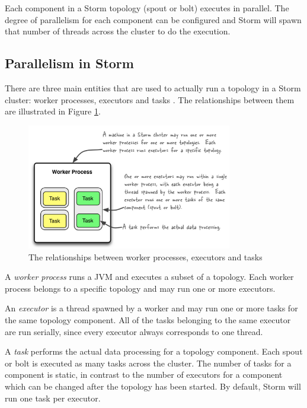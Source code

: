 Each component in a Storm topology (spout or bolt) executes in parallel. The degree of parallelism for each component can be configured and Storm will spawn that number of threads across the cluster to do the execution.

\subsection{Parallelism in Storm}

There are three main entities that are used to actually run a topology in a Storm cluster: worker processes, executors and tasks \cite{storm_parallelism}. The relationships between them are illustrated in Figure \ref{figure:storm_parallelism}.

\begin{figure}[H]
\centering
\includegraphics[width=0.8\textwidth]{figures/storm_parallelism}
\caption{The relationships between worker processes, executors and tasks}
\label{figure:storm_parallelism}
\end{figure}

A \emph{worker process} runs a JVM and executes a subset of a topology. Each worker process belongs to a specific topology and may run one or more executors.

An \emph{executor} is a thread spawned by a worker and may run one or more tasks for the same topology component. All of the tasks belonging to the same executor are run serially, since every executor always corresponds to one thread.

A \emph{task} performs the actual data processing for a topology component. Each spout or bolt is executed as many tasks across the cluster. The number of tasks for a component is static, in contrast to the number of executors for a component which can be changed after the topology has been started. By default, Storm will run one task per executor.

